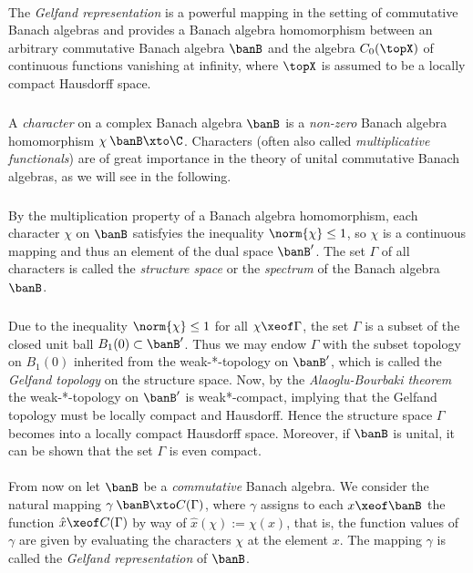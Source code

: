 \documentclass[11pt,twoside]{article}
\begin{document}
\paragraph{} %
The \textit{Gelfand representation} is a powerful mapping
in the setting of commutative Banach algebras
and provides a Banach algebra homomorphism
between an arbitrary commutative Banach algebra $\banB$ and
the algebra $C_0(\topX)$ of continuous functions vanishing at infinity,
where $\topX$ is assumed to be a locally compact Hausdorff space.

\subparagraph{} %
A \textit{character} on a complex Banach algebra $\banB$
is a \textit{non-zero} Banach algebra homomorphism $\chi \:\banB \xto \C$.
Characters (often also called \textit{multiplicative functionals}) are
of great importance in the theory of unital commutative Banach algebras,
as we will see in the following.

\subparagraph{}
By the multiplication property of a Banach algebra homomorphism,
each character $\chi$ on $\banB$ satisfyies the inequality
$\norm{\chi} \leq 1$,
so $\chi$ is a continuous mapping and
thus an element of the dual space $\banB'$.
The set $\Gamma$ of all characters is called the \textit{structure space}
or the \textit{spectrum} of the Banach algebra $\banB$.

\subparagraph{} %
Due to the inequality $\norm{\chi} \leq 1$ for all $\chi \xeof \Gamma$,
the set $\Gamma$ is a subset of the closed unit ball $B_1(0) \subset \banB'$.
Thus we may endow $\Gamma$ with the subset topology on $B_1(0)$
inherited from the weak-*-topology on $\banB'$,
which is called the \textit{Gelfand topology} on the structure space.
Now,
by the \textit{Alaoglu-Bourbaki theorem}
the weak-*-topology on $\banB'$ is weak*-compact,
implying
that the Gelfand topology must be locally compact and Hausdorff.
Hence the structure space $\Gamma$ becomes into
a locally compact Hausdorff space.
Moreover, 
if $\banB$ is unital,
it can be shown that the set $\Gamma$ is even compact.

\paragraph{} %
From now on
let $\banB$ be a \textit{commutative} Banach algebra.
We consider the natural mapping $\gamma \:\banB \xto C(\Gamma)$,
where $\gamma$ assigns to each $x \xeof \banB$ the function
$\hat{x} \xeof C(\Gamma)$ by way of $\hat{x}(\chi) := \chi(x)$,
that is,
the function values of $\gamma$ are given by evaluating
the characters $\chi$ at the element $x$.
The mapping $\gamma$ is called the \textit{Gelfand representation}
of $\banB$.
\end{document}
